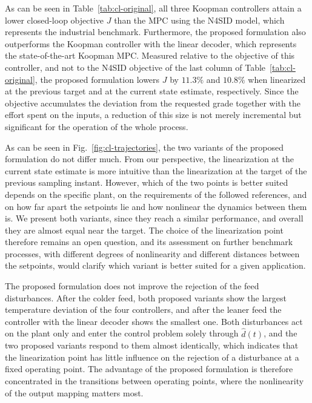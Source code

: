 \documentclass[preprint,12pt,authoryear]{elsarticle}
\theoremstyle{remark}
\begin{document}
As can be seen in Table~\ref{tab:cl-original}, all three Koopman controllers attain a lower closed-loop objective $J$ than the MPC using the N4SID model, which represents the industrial benchmark. Furthermore, the proposed formulation also outperforms the Koopman controller with the linear decoder, which represents the state-of-the-art Koopman MPC. Measured relative to the objective of this controller, and not to the N4SID objective of the last column of Table~\ref{tab:cl-original}, the proposed formulation lowers $J$ by $11.3\%$ and $10.8\%$ when linearized at the previous target and at the current state estimate, respectively. Since the objective accumulates the deviation from the requested grade together with the effort spent on the inputs, a reduction of this size is not merely incremental but significant for the operation of the whole process.

As can be seen in Fig.~\ref{fig:cl-trajectories}, the two variants of the proposed formulation do not differ much. From our perspective, the linearization at the current state estimate is more intuitive than the linearization at the target of the previous sampling instant. However, which of the two points is better suited depends on the specific plant, on the requirements of the followed references, and on how far apart the setpoints lie and how nonlinear the dynamics between them is. We present both variants, since they reach a similar performance, and overall they are almost equal near the target. The choice of the linearization point therefore remains an open question, and its assessment on further benchmark processes, with different degrees of nonlinearity and different distances between the setpoints, would clarify which variant is better suited for a given application.

The proposed formulation does not improve the rejection of the feed disturbances. After the colder feed, both proposed variants show the largest temperature deviation of the four controllers, and after the leaner feed the controller with the linear decoder shows the smallest one. Both disturbances act on the plant only and enter the control problem solely through $\hat{d}(t)$, and the two proposed variants respond to them almost identically, which indicates that the linearization point has little influence on the rejection of a disturbance at a fixed operating point. The advantage of the proposed formulation is therefore concentrated in the transitions between operating points, where the nonlinearity of the output mapping matters most.
\end{document}
